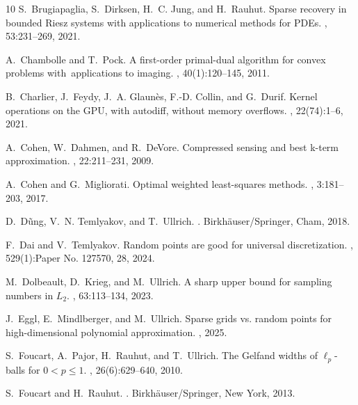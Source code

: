 \documentclass[11pt,reqno, a4paper]{article}
\numberwithin{equation}{section}
\begin{document}
\begin{thebibliography}{10}
S.~Brugiapaglia, S.~Dirksen, H.~C. Jung, and H.~Rauhut.
\newblock Sparse recovery in bounded {R}iesz systems with applications to
  numerical methods for {PDE}s.
, 53:231--269, 2021.

A.~Chambolle and T.~Pock.
\newblock A first-order primal-dual algorithm for convex problems
  with applications to imaging.
, 40(1):120--145,
  2011.

B.~Charlier, J.~Feydy, J.~A. Glaunès, F.-D. Collin, and G.~Durif.
\newblock Kernel operations on the {GPU}, with autodiff, without memory
  overflows.
, 22(74):1--6, 2021.

A.~Cohen, W.~Dahmen, and R.~DeVore.
\newblock Compressed sensing and best k-term approximation.
, 22:211--231, 2009.

A.~Cohen and G.~Migliorati.
\newblock Optimal weighted least-squares methods.
, 3:181--203, 2017.

D.~D\~{u}ng, V.~N. Temlyakov, and T.~Ullrich.
.
\newblock Birkh\"{a}user/Springer, Cham, 2018.

F.~Dai and V.~Temlyakov.
\newblock Random points are good for universal discretization.
, 529(1):Paper
  No. 127570, 28, 2024.

M.~Dolbeault, D.~Krieg, and M.~Ullrich.
\newblock A sharp upper bound for sampling numbers in {$L_2$}.
, 63:113--134, 2023.

J.~Eggl, E.~Mindlberger, and M.~Ullrich.
\newblock Sparse grids vs. random points for high-dimensional polynomial
  approximation.
, 2025.

S.~Foucart, A.~Pajor, H.~Rauhut, and T.~Ullrich.
\newblock The {G}elfand widths of $\ell_p$-balls for $0<p\leq1$.
, 26(6):629--640, 2010.

S.~Foucart and H.~Rauhut.
.
\newblock Birkh\"{a}user/Springer, New York, 2013.


\end{thebibliography}
\end{document}
